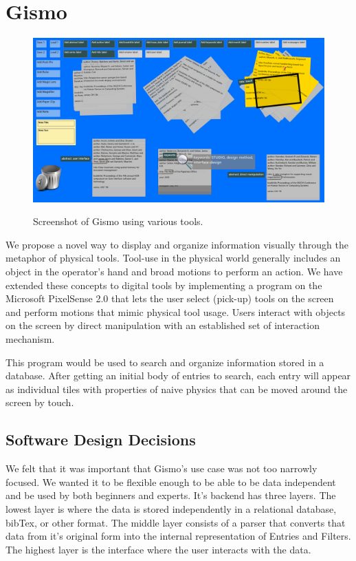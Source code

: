 \documentclass{article}
\begin{document}
\section{Gismo}


\begin{figure}[b!]
\centering
\scalebox{.239}
{\includegraphics{HabilisScreenShot.png}}
\caption{Screenshot of Gismo using various tools.}
\label{Fig:screenshot}
\end{figure}


We propose a novel way to display and organize information visually through the metaphor of physical tools. Tool-use in the physical world generally includes an object in the operator's hand and broad motions to perform an action. We have extended these concepts to digital tools by implementing a program on the Microsoft PixelSense 2.0 that lets the user select (pick-up) tools on the screen and perform motions that mimic physical tool usage. Users interact with objects on the screen by direct manipulation with an established set of interaction mechanism.  

This program would be used to search and organize information stored in a database.  After getting an initial body of entries to search, each entry will appear as individual tiles with properties of naive physics that can be moved around the screen by touch. 



\subsection{Software Design Decisions}

We felt that it was important that Gismo's use case was not too narrowly focused.  We wanted it to be flexible enough to be able to be data independent and be used by both beginners and experts.  It's backend has three layers.  The lowest layer is where the data is stored independently in a relational database, bibTex, or other format. The middle layer consists of a parser that converts that data from it's original form into the internal representation of Entries and Filters.  The highest layer is the interface where the user interacts with the data. 
\end{document}
